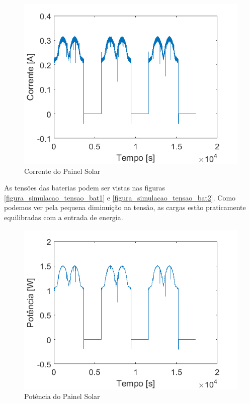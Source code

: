 \begin{figure}[!htpb]
\begin{center}
\includegraphics[scale=0.5]{figures/simulatedSolarPanelCurrent.png}
\caption{Corrente do Painel Solar}
\label{figura_simulacao_corrente_painel_solar}
\end{center}
\end{figure}

As tensões das baterias podem ser vistas nas figuras \ref{figura_simulacao_tensao_bat1} e \ref{figura_simulacao_tensao_bat2}. Como podemos ver pela pequena diminuição na tensão, as cargas estão praticamente equilibradas com a entrada de energia.

\begin{figure}[!htpb]
\begin{center}
\includegraphics[scale=0.5]{figures/simulatedSolarPanelPower.png}
\caption{Potência do Painel Solar}
\label{figura_simulacao_potencia_painel_solar}
\end{center}
\end{figure}

